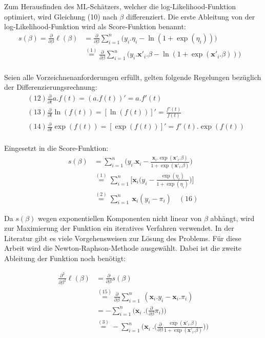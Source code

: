 \documentclass[12pt,]{article}
\begin{document}
Zum Herausfinden des ML-Schätzers, welcher die log-Likelihood-Funktion
optimiert, wird Gleichung (10) nach \(\beta\) differenziert. Die erste
Ableitung von der log-Likelihood-Funktion wird als Score-Funktion
benannt: \[
\begin{aligned}
s(\beta) = \frac{\partial}{\partial \beta}  \ell(\beta) &= \frac{\partial}{\partial \beta} \sum_{i = 1}^{n} \Big( y_i.\eta_i - \ln (1 + \exp(\eta_i)) \Big) \quad \\
&\mathrel{\overset{(1)}{=}} \frac{\partial}{\partial \beta} \sum_{i = 1}^{n} \Big( y_i.\mathbf{x'}_i.\beta  - \ln (1 + \exp(\mathbf{x'}_i.\beta )) \Big) \quad \\ 
\end{aligned}
\]

Seien alle Vorzeichnenanforderungen erfüllt, gelten folgende Regelungen
bezüglich der Differenzierungsrechnung: \[
\begin{aligned}
&(12) \frac{\partial}{\partial t} a.f(t) = (a.f(t))' = a.f'(t) \\
&(13) \frac{\partial}{\partial t} \ln(f(t)) = [\ln(f(t))]' = \frac{f'(t)}{f(t)} \\ 
&(14) \frac{\partial}{\partial t} \exp(f(t)) = [\exp(f(t))]' = f'(t).\exp(f(t)) \\
\end{aligned}
\]

Eingesetzt in die Score-Funktion: \[
\begin{aligned}
s(\beta) &= \sum_{i = 1}^{n} \Bigg( y_i.\mathbf{x}_i - \frac{\mathbf{x}_i.\exp(\mathbf{x'}_i.\beta)}{1 + \exp(\mathbf{x'}_i.\beta)} \Bigg) \\
&\mathrel{\overset{(1)}{=}}\sum_{i = 1}^{n} \Bigg[ \mathbf{x}_i \Bigg( y_i - \frac{\exp(\eta_i)}{1 + \exp(\eta_i)} \Bigg) \Bigg] \\
&\mathrel{\overset{(2)}{=}}  \sum_{i = 1}^{n} \ \mathbf{x}_i ( y_i - \pi_i) \quad (16)
\end{aligned}
\]

Da \(s(\beta)\) wegen exponentiellen Komponenten nicht linear von
\(\beta\) abhängt, wird zur Maximierung der Funktion ein iteratives
Verfahren verwendet. In der Literatur gibt es viele Vorgehensweisen zur
Lösung des Problems. Für diese Arbeit wird die Newton-Raphson-Methode
ausgewählt. Dabei ist die zweite Ableitung der Funktion noch benötigt:

\[
\begin{aligned}
\frac{\partial^2}{\partial \beta^2} \ell(\beta) &= \frac{\partial}{\partial \beta} s(\beta) \\ 
&\mathrel{\overset{(15)}{=}} \frac{\partial}{\partial \beta} \sum_{i = 1}^{n} \ (\mathbf{x}_i.y_i - \mathbf{x}_i.\pi_i) \\
&= - \sum_{i = 1}^{n} \Bigg( \mathbf{x}_i \ .  \Big(\frac{\partial}{\partial \beta} \pi_i \Big) \Bigg) \\
&\mathrel{\overset{(3)}{=}} - \sum_{i = 1}^{n} \Bigg( \mathbf{x}_i \ .  \Big(\frac{\partial}{\partial \beta} \frac{\exp(\mathbf{x'}_i.\beta)}{1+\exp(\mathbf{x'}_i.\beta)} \Big) \Bigg) \\
\end{aligned}
\]
\end{document}

